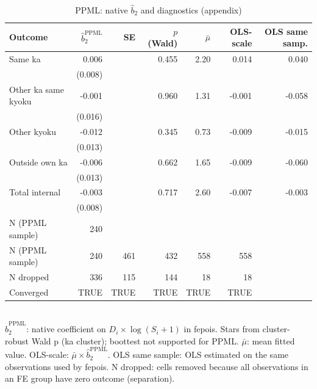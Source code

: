 \begin{table}[!htbp]
  \centering
  \caption{PPML: native $\hat{b}_2$ and diagnostics (appendix)}
  \label{tab:ppml_native_v6}
  \begin{tabular}{lrrrrrr}
    \hline\hline
    Outcome & $\hat{b}_2^{\text{PPML}}$ & SE & $p$ (Wald) & $\bar{\mu}$ & OLS-scale & OLS same samp. \\
    \hline
    Same ka & 0.006 &  & 0.455 & 2.20 & 0.014 & 0.040 &  \\
     & (0.008) &  &  &  &  &  &  \\
    Other ka same kyoku & -0.001 &  & 0.960 & 1.31 & -0.001 & -0.058 &  \\
     & (0.016) &  &  &  &  &  &  \\
    Other kyoku & -0.012 &  & 0.345 & 0.73 & -0.009 & -0.015 &  \\
     & (0.013) &  &  &  &  &  &  \\
    Outside own ka & -0.006 &  & 0.662 & 1.65 & -0.009 & -0.060 &  \\
     & (0.013) &  &  &  &  &  &  \\
    Total internal & -0.003 &  & 0.717 & 2.60 & -0.007 & -0.003 &  \\
     & (0.008) &  &  &  &  &  &  \\
    \hline
    N (PPML sample) & 240 &  &  &  &  &  &  \\
    \hline
    N (PPML sample) & 240 & 461 & 432 & 558 & 558 &  &  \\
    N dropped & 336 & 115 & 144 & 18 & 18 &  &  \\
    Converged & TRUE & TRUE & TRUE & TRUE & TRUE &  &  \\
    \hline\hline
  \end{tabular}
  \\[4pt]
  \footnotesize
  $\hat{b}_2^{\text{PPML}}$: native coefficient on $D_i \times \log(S_i+1)$ in fepois.
  Stars from cluster-robust Wald p (ka cluster); boottest not supported for PPML.
  $\bar{\mu}$: mean fitted value. OLS-scale: $\bar{\mu} \times \hat{b}_2^{\text{PPML}}$.
  OLS same sample: OLS estimated on the same observations used by fepois.
  N dropped: cells removed because all observations in an FE group have zero outcome (separation).
\end{table}
